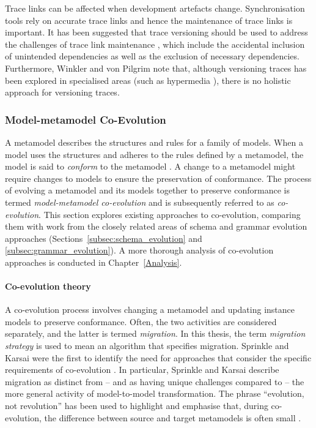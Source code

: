 Trace links can be affected when development artefacts change. Synchronisation tools rely on accurate trace links and hence the maintenance of trace links is important. It \cc has been suggested that trace versioning should be used to address the challenges of trace link maintenance \cite{winkler09survey}, which include the accidental inclusion of unintended dependencies as well as the exclusion of necessary dependencies. Furthermore, \cc Winkler and von Pilgrim note that, although versioning traces has been explored in specialised areas (such as hypermedia \cite{nguyen05versioning}), there is no holistic approach for versioning traces.

\subsubsection{Model-metamodel Co-Evolution}
\label{LitReview:ModelCoEvo}
A metamodel describes the structures and rules for a family of models. When a model uses the structures and adheres to the rules defined by a metamodel, the model is said to \emph{conform} to the metamodel \cite{bezivin05unification}. A change to a metamodel might require changes to models to ensure the preservation of conformance. The process of evolving a metamodel and its models together to preserve conformance is termed \emph{model-metamodel co-evolution} and is subsequently referred to as \emph{co-evolution}. This section explores existing approaches to co-evolution, comparing them with work from the closely related areas of schema and grammar evolution approaches (Sections~\ref{subsec:schema_evolution} and \ref{subsec:grammar_evolution}). A more thorough analysis of co-evolution approaches is conducted in Chapter~\ref{Analysis}.

\paragraph{Co-evolution theory}
A co-evolution process involves changing a metamodel and updating instance models to preserve conformance. Often, the two activities are considered separately, and the latter is termed \emph{migration}. In this thesis, the term \emph{migration strategy} is used to mean an algorithm that specifies migration. Sprinkle \cc and Karsai were the first to identify the need for approaches that consider the specific requirements of co-evolution \cite{sprinkle04domain}. In particular, Sprinkle and Karsai describe migration as distinct from -- and as having unique challenges compared to -- the more general activity of model-to-model transformation. The \cc phrase ``evolution, not revolution'' has been used to highlight and emphasise that, during co-evolution, the difference between source and target metamodels is often small \cite{sprinkle03thesis}.


